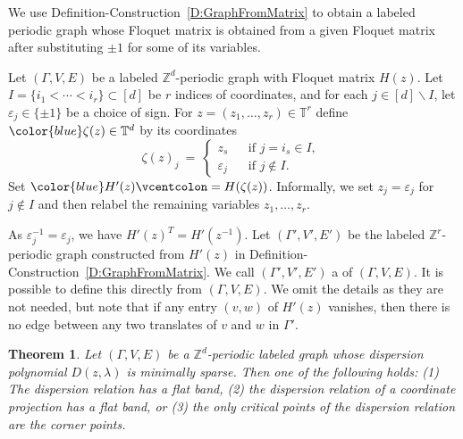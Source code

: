 \documentclass[12pt]{amsart}
\newtheorem{Theorem}{Theorem}[section]
\theoremstyle{remark}
\newenvironment{Definition}
{\pushQED{\qed}\renewcommand{\qedsymbol}{$\diamond$}\definition}
{\popQED\enddefinition}
\newcommand{\TT}{{\mathbb T}}
\newcommand{\ZZ}{{\mathbb Z}}
\newcommand{\defcolor}[1]{{\color{blue}#1}}
\newcommand{\demph}[1]{\defcolor{{\sl #1}}}
\begin{document}
We use Definition-Construction~\ref{D:GraphFromMatrix} to obtain a labeled periodic graph whose Floquet matrix is obtained
from a given Floquet matrix after substituting $\pm1$ for some of its variables.

\begin{Definition}\label{D:coordinateProjection}
  Let $(\Gamma,V,E)$ be a labeled $\ZZ^d$-periodic graph with Floquet matrix $H(z)$.
  Let $I=\{i_1<\dotsb<i_r\}\subset[d]$ be $r$ indices of coordinates, and for each $j\in[d]\smallsetminus I$, let
  $\varepsilon_j\in\{\pm1\}$ be a choice of sign.
  For $z=(z_1,\dotsc,z_r)\in\TT^r$ define $\defcolor{\zeta(z)}\in\TT^d$ by its coordinates
  \begin{equation}\label{Eq:coordSubst}
    \zeta(z)_j\ =\
    \left\{\begin{array}{rcl} z_s&&\mbox{if } j=i_s\in I,\\ \varepsilon_j&&\mbox{if }j\not\in I.\end{array}\right.\ 
  \end{equation}
  Set $\defcolor{H'(z)}\vcentcolon= H(\zeta(z))$.
  Informally, we set $z_j=\varepsilon_j$ for $j\not\in I$ and then relabel the remaining variables
  $z_1,\dotsc,z_r$.
  
  As $\varepsilon_j^{-1}=\varepsilon_j$, we have $H'(z)^T=H'(z^{-1})$.
  Let \defcolor{$(\Gamma',V',E')$} be the labeled $\ZZ^r$-periodic graph constructed from $H'(z)$ in
  Definition-Construction~\ref{D:GraphFromMatrix}.
  We call $(\Gamma',V',E')$ a \demph{coordinate projection} of $(\Gamma,V,E)$.
  It is possible to define this directly from $(\Gamma,V,E)$.
  We omit the details as they are not needed, but note that if any entry $(v,w)$ of $H'(z)$ vanishes, then there is no edge between
  any two translates of $v$ and $w$ in $\Gamma'$.
\end{Definition}


\begin{Theorem}\label{Thm:RealFamCross}
  Let $(\Gamma,V,E)$ be a $\ZZ^d$-periodic labeled graph whose dispersion polynomial $D(z,\lambda)$ is  minimally sparse.
  Then one of the following holds:
  (1) The dispersion relation has a flat band,
  (2) the dispersion relation of a coordinate projection has a flat band,
  or (3) the only critical points of the dispersion relation are the corner points.
\end{Theorem}
\end{document}
